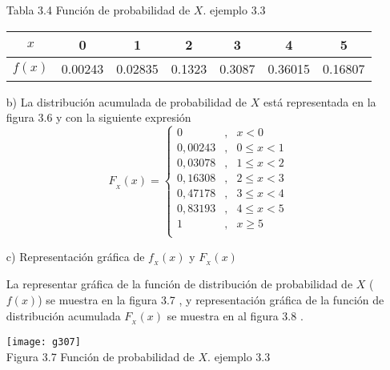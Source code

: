 \documentclass[base=hide,12pt]{elegantbook}
\begin{document}
\begin{itemize}
\begin{center}
{\begin{tabular}{cp{6cm}p{2.5cm}c}
				&&&\\ \hline
			\end{tabular}
		}
\end{center}
\newpage	
\begin{center}
Tabla 3.4 Función de probabilidad de $X$. ejemplo 3.3\\	
	{\footnotesize 
			\begin{tabular}{c|cccccc}%
				$x$ 		& 0  		& 1			&  2 		& 3 	& 4 		& 5 \\
				\hline
				$f(x)$ 	& 0.00243	&0.02835	& 0.1323	&0.3087	&0.36015	&0.16807  \\ 
			\end{tabular}
}
		\end{center}
\vspace{1cm}
\item[b)] La distribución acumulada de probabilidad de $X$ está representada en la figura 3.6 y con la siguiente expresión
\vspace{.5cm}
	\begin{equation*}
		F_{_X}(x)=\left\lbrace
		\begin{array}{lcl}
			0 &,& x<0 \\
			0,00243&, & 0\leq x<1  \\
			0,03078&, & 1\leq x<2 \\
			0,16308&, & 2\leq x<3 \\
			0,47178&, & 3\leq x<4 \\
			0,83193&, & 4\leq x<5 \\
			1 &,& x\geq 5  \\		
		\end{array}
		\right.
	\end{equation*}
\vspace{1cm}
\item[c)] Representación gráfica de $f_{_X}(x)$ y $F_{_X}(x)$
	
	
La  representar gráfica de la función de distribución de probabilidad de $X$ ($f(x)$)  se muestra en la figura 3.7 , y representación gráfica de la función de distribución acumulada $F_{_{X}}(x)$ se muestra en al figura 3.8 .
\begin{center}
\texttt{[image: g307]}\\
Figura 3.7 Función de probabilidad de $X$. ejemplo 3.3 
\end{center}
	


\end{itemize}
\end{document}
